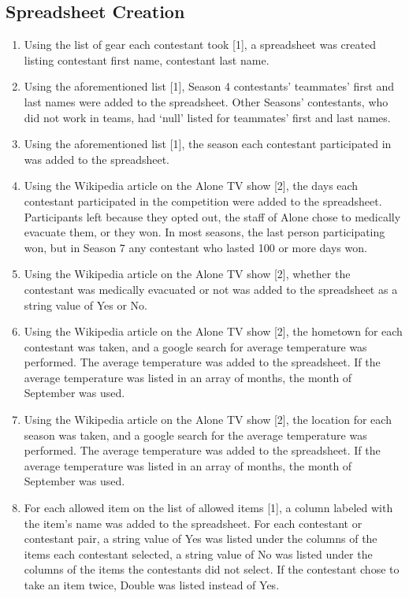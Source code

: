 \documentclass[letterpaper,twoside,11pt,twocolumn]{article}
\begin{document}
\subsection{Spreadsheet Creation}
\begin{enumerate}
    \item Using the list of gear each contestant took [1], a spreadsheet was created listing contestant first name, contestant last name.
    \item Using the aforementioned list [1], Season 4 contestants’ teammates’ first and last names were added to the spreadsheet. Other Seasons’ contestants, who did not work in teams, had ‘null’ listed for teammates’ first and last names.
    \item Using the aforementioned list [1], the season each contestant participated in was added to the spreadsheet. 
    \item Using the Wikipedia article on the Alone TV show [2], the days each contestant participated in the competition were added to the spreadsheet. Participants left because they opted out, the staff of Alone chose to medically evacuate them, or they won. In most seasons, the last person participating won, but in Season 7 any contestant who lasted 100 or more days won. 
    \item Using the Wikipedia article on the Alone TV show [2], whether the contestant was medically evacuated or not was added to the spreadsheet as a string value of Yes or No. 
    \item Using the Wikipedia article on the Alone TV show [2], the hometown for each contestant was taken, and a google search for average temperature was performed. The average temperature was added to the spreadsheet. If the average temperature was listed in an array of months, the month of September was used. 
    \item Using the Wikipedia article on the Alone TV show [2], the location for each season was taken, and a google search for the average temperature was performed. The average temperature was added to the spreadsheet. If the average temperature was listed in an array of months, the month of September was used. 
    \item For each allowed item on the list of allowed items [1], a column labeled with the item’s name was added to the spreadsheet. For each contestant or contestant pair, a string value of Yes was listed under the columns of the items each contestant selected, a string value of No was listed under the columns of the items the contestants did not select. If the contestant chose to take an item twice, Double was listed instead of Yes.
\end{enumerate}
\end{document}
